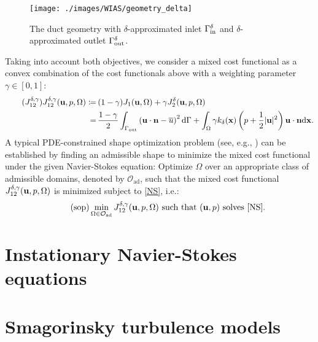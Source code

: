 \documentclass[11pt]{article}
\numberwithin{equation}{section}
\begin{document}
\begin{figure}[H]
    \centering
    \texttt{[image: ./images/WIAS/geometry\_delta]}
    \caption{The duct geometry with $\delta$-approximated inlet $\Gamma_{\rm in}^\delta$ and $\delta$-approximated outlet $\Gamma_{\rm out}^\delta$.}
    \label{fig:geometry cutoff inlet outlet}
\end{figure}
Taking into account both objectives, we consider a mixed cost functional as a convex combination of the cost functionals above with a weighting parameter $\gamma\in[0,1]$:
\begin{align}
    \label{mixed cost functional}
    \tag{$J_{12}^{\delta,\gamma}$}
    J_{12}^{\delta,\gamma}({\bf u},p,\Omega)\coloneqq&\, (1 - \gamma)J_1({\bf u},\Omega) + \gamma J_2^\delta({\bf u},p,\Omega)\\
    =&\,\frac{1 - \gamma}{2}\int_{\Gamma_{\rm out}} \left({\bf u}\cdot{\bf n} - \overline{u}\right)^2{\rm d}\Gamma + \int_\Omega \gamma k_\delta({\bf x})\left(p + \frac{1}{2}|{\bf u}|^2\right){\bf u}\cdot{\bf n}{\rm d}{\bf x}.\nonumber
\end{align}
A typical PDE-constrained shape optimization problem (see, e.g., \cite{Delfour_Zolesio2011, Sokolowski_Zolesio1992}) can be established by finding an admissible shape to minimize the mixed cost functional under the given Navier-Stokes equation: Optimize $\Omega$ over an appropriate class of admissible domains, denoted by $\mathcal{O}_{\textrm{ad}}$, such that the mixed cost functional $J_{12}^{\delta,\gamma}({\bf u},p,\Omega)$ is minimized subject to \eqref{NS}, i.e.:
\begin{align}
    \label{shape optimization problem}
    \tag{sop}
    \min_{\Omega\in\mathcal{O}_{\textrm{ad}}} J_{12}^{\delta,\gamma}({\bf u},p,\Omega) \mbox{ such that } ({\bf u},p)\mbox{ solves \eqref{NS}}.
\end{align}

\section{Instationary Navier-Stokes equations}

\section{Smagorinsky turbulence models}
\end{document}
